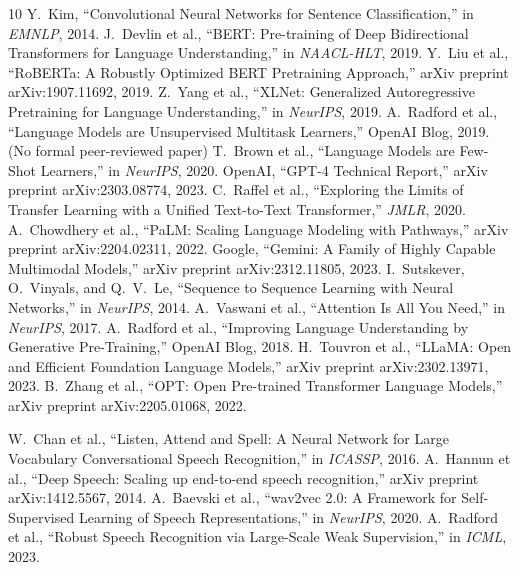 \documentclass{article}
\begin{document}
\begin{thebibliography}{10}
 Y.~Kim, ``Convolutional Neural Networks for Sentence Classification,'' in \textit{EMNLP}, 2014.
 J.~Devlin et al., ``BERT: Pre-training of Deep Bidirectional Transformers for Language Understanding,'' in \textit{NAACL-HLT}, 2019.
 Y.~Liu et al., ``RoBERTa: A Robustly Optimized BERT Pretraining Approach,'' arXiv preprint arXiv:1907.11692, 2019.
 Z.~Yang et al., ``XLNet: Generalized Autoregressive Pretraining for Language Understanding,'' in \textit{NeurIPS}, 2019.
 A.~Radford et al., ``Language Models are Unsupervised Multitask Learners,'' OpenAI Blog, 2019. (No formal peer-reviewed paper)
 T.~Brown et al., ``Language Models are Few-Shot Learners,'' in \textit{NeurIPS}, 2020.
 OpenAI, ``GPT-4 Technical Report,'' arXiv preprint arXiv:2303.08774, 2023.
 C.~Raffel et al., ``Exploring the Limits of Transfer Learning with a Unified Text-to-Text Transformer,'' \textit{JMLR}, 2020.
 A.~Chowdhery et al., ``PaLM: Scaling Language Modeling with Pathways,'' arXiv preprint arXiv:2204.02311, 2022.
 Google, ``Gemini: A Family of Highly Capable Multimodal Models,'' arXiv preprint arXiv:2312.11805, 2023.
 I.~Sutskever, O.~Vinyals, and Q.~V.~Le, ``Sequence to Sequence Learning with Neural Networks,'' in \textit{NeurIPS}, 2014.
 A.~Vaswani et al., ``Attention Is All You Need,'' in \textit{NeurIPS}, 2017.
 A.~Radford et al., ``Improving Language Understanding by Generative Pre-Training,'' OpenAI Blog, 2018.
 H.~Touvron et al., ``LLaMA: Open and Efficient Foundation Language Models,'' arXiv preprint arXiv:2302.13971, 2023.
 B.~Zhang et al., ``OPT: Open Pre-trained Transformer Language Models,'' arXiv preprint arXiv:2205.01068, 2022.

 W.~Chan et al., ``Listen, Attend and Spell: A Neural Network for Large Vocabulary Conversational Speech Recognition,'' in \textit{ICASSP}, 2016.
 A.~Hannun et al., ``Deep Speech: Scaling up end-to-end speech recognition,'' arXiv preprint arXiv:1412.5567, 2014.
 A.~Baevski et al., ``wav2vec 2.0: A Framework for Self-Supervised Learning of Speech Representations,'' in \textit{NeurIPS}, 2020.
 A.~Radford et al., ``Robust Speech Recognition via Large-Scale Weak Supervision,'' in \textit{ICML}, 2023.


\end{thebibliography}
\end{document}
